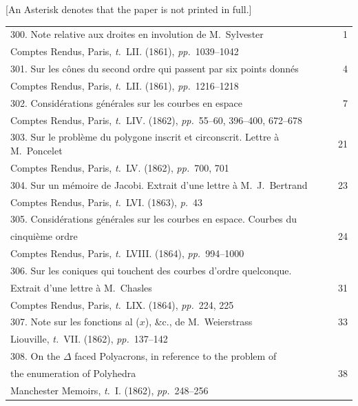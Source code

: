 \documentclass[11pt,a4paper]{article}
\newcommand{\tome}{\textit{t.}}
\newcommand{\page}{\textit{p.}}
\newcommand{\pages}{\textit{pp.}}
\begin{document}
[An Asterisk denotes that the paper is not printed in full.]

\begin{longtable}{p{4.8in}r}
300. Note relative aux droites en involution de M.~Sylvester & 1 \\[-0.3em]
\multicolumn{2}{l}{\quad\small Comptes Rendus, Paris, \tome~LII. (1861), \pages~1039--1042} \\[0.5em]

301. Sur les c\^{o}nes du second ordre qui passent par six points donn\'{e}s & 4 \\[-0.3em]
\multicolumn{2}{l}{\quad\small Comptes Rendus, Paris, \tome~LII. (1861), \pages~1216--1218} \\[0.5em]

302. Consid\'{e}rations g\'{e}n\'{e}rales sur les courbes en espace & 7 \\[-0.3em]
\multicolumn{2}{l}{\quad\small Comptes Rendus, Paris, \tome~LIV. (1862), \pages~55--60, 396--400, 672--678} \\[0.5em]

303. Sur le probl\`{e}me du polygone inscrit et circonscrit. Lettre \`{a} M.~Poncelet & 21 \\[-0.3em]
\multicolumn{2}{l}{\quad\small Comptes Rendus, Paris, \tome~LV. (1862), \pages~700, 701} \\[0.5em]

304. Sur un m\'{e}moire de Jacobi. Extrait d'une lettre \`{a} M.~J.~Bertrand & 23 \\[-0.3em]
\multicolumn{2}{l}{\quad\small Comptes Rendus, Paris, \tome~LVI. (1863), \page~43} \\[0.5em]

\multicolumn{2}{l}{305. Consid\'{e}rations g\'{e}n\'{e}rales sur les courbes en espace. Courbes du} \\[-0.3em]
\quad cinqui\`{e}me ordre & 24 \\[-0.3em]
\multicolumn{2}{l}{\quad\small Comptes Rendus, Paris, \tome~LVIII. (1864), \pages~994--1000} \\[0.5em]

\multicolumn{2}{l}{306. Sur les coniques qui touchent des courbes d'ordre quelconque.} \\[-0.3em]
\quad Extrait d'une lettre \`{a} M.~Chasles & 31 \\[-0.3em]
\multicolumn{2}{l}{\quad\small Comptes Rendus, Paris, \tome~LIX. (1864), \pages~224, 225} \\[0.5em]

307. Note sur les fonctions al ($x$), \&c., de M.~Weierstrass & 33 \\[-0.3em]
\multicolumn{2}{l}{\quad\small Liouville, \tome~VII. (1862), \pages~137--142} \\[0.5em]

\multicolumn{2}{l}{308. On the $\Delta$ faced Polyacrons, in reference to the problem of} \\[-0.3em]
\quad the enumeration of Polyhedra & 38 \\[-0.3em]
\multicolumn{2}{l}{\quad\small Manchester Memoirs, \tome~I. (1862), \pages~248--256} \\[0.5em]
\end{longtable}
\end{document}
